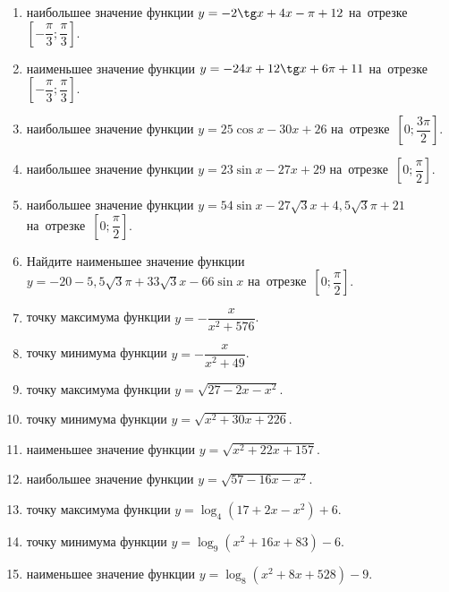 \documentclass[a4paper,10pt]{article}
\begin{document}
\begin{enumerate}
\item {} наибольшее значение функции $y=-2\tg x +4x-\pi +12$ на~отрезке~$\left[-\dfrac{\pi}{3};\dfrac{\pi}{3}\right]$.

\item {} наименьшее значение функции $y=-24x +12\tg x+6\pi+11$ на~отрезке~$\left[-\dfrac{\pi}{3};\dfrac{\pi}{3}\right]$.

\item {} наибольшее значение функции $y=25\cos x-30x+26$ на~отрезке~$\left[0;\dfrac{3\pi}{2}\right]$.

\item {} наибольшее значение функции $y=23\sin x-27x+29$ на~отрезке~$\left[0;\dfrac{\pi}{2}\right]$.

\item {} наибольшее значение функции $y=54\sin x-27\sqrt{3}x+4,5\sqrt{3}\pi +21$ на~отрезке~$\left[0;\dfrac{\pi}{2}\right]$.

\item Найдите наименьшее значение функции $y=-20-5,5\sqrt{3}\pi+33\sqrt{3}x-66\sin x$ на~отрезке~$\left[0;\dfrac{\pi}{2}\right]$.

\item {} точку максимума функции $y=-\dfrac{x}{ x^2 +576}$.

\item {} точку минимума функции $y=-\dfrac{x}{ x^2 +49}$.

\item {} точку максимума функции $y=\sqrt{27-2x-x^2}$.

\item {} точку минимума функции $y=\sqrt{x^2+30x+226}$.

\item {} наименьшее значение функции $y=\sqrt{x^2+22x+157}$.

\item {} наибольшее значение функции $y=\sqrt{57-16x-x^2}$.

\item {} точку максимума функции $y=\log_4\left(17+2x-x^2\right)+6$.

\item {} точку минимума функции $y=\log_9\left(x^2+16x+83\right)-6$.

\item {} наименьшее значение функции $y=\log_8\left(x^2+8x+528\right)-9$.


\end{enumerate}
\end{document}
